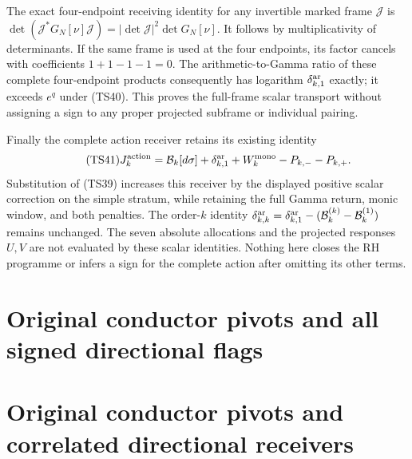 The exact four-endpoint receiving identity for any invertible marked
frame $\mathcal J$ is
$\det(\mathcal J^*G_N[\nu]\mathcal J)=|\det\mathcal J|^2\det G_N[\nu]$.
It follows by multiplicativity of determinants. If the same frame is
used at the four endpoints, its factor cancels with coefficients
$1+1-1-1=0$. The arithmetic-to-Gamma ratio of these complete
four-endpoint products consequently has logarithm
$\delta_{k,1}^{\rm ar}$ exactly; it exceeds $e^q$ under (TS40).
This proves the full-frame scalar transport without assigning a
sign to any proper projected subframe or individual pairing.

Finally the complete action receiver retains its existing identity
\begin{equation}\tag{TS41}
 J_k^{\rm action}
 =\mathcal B_k[d\sigma]+\delta_{k,1}^{\rm ar}
   +W_k^{\rm mono}-P_{k,-}-P_{k,+}.
\end{equation}
Substitution of (TS39) increases this receiver by the displayed
positive scalar correction on the simple stratum, while retaining
the full Gamma return, monic window, and both penalties. The
order-$k$ identity
$\delta_{k,k}^{\rm ar}=\delta_{k,1}^{\rm ar}
 -(\mathcal B_k^{(k)}-\mathcal B_k^{(1)})$ remains unchanged.
The seven absolute allocations and the projected responses $U,V$
are not evaluated by these scalar identities. Nothing here closes
the RH programme or infers a sign for the complete action after
omitting its other terms.



\endgroup

\clearpage
\begingroup


\setcounter{equation}{0}
\renewcommand{\theequation}{A02CRP.\arabic{equation}}
\section*{Original conductor pivots and all signed directional flags}
\begingroup
\section{Original conductor pivots and correlated directional receivers}
\label{a02crp:sec:CRP}
